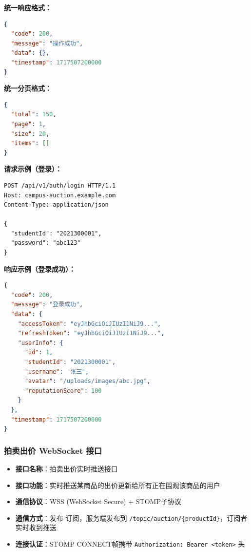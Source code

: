 \documentclass[12pt,a4paper]{ctexart}
\numberwithin{figure}{section}
\numberwithin{table}{section}
\begin{document}
\textbf{统一响应格式：}

\begin{lstlisting}[language=json]
{
  "code": 200,
  "message": "操作成功",
  "data": {},
  "timestamp": 1717507200000
}
\end{lstlisting}

\textbf{统一分页格式：}

\begin{lstlisting}[language=json]
{
  "total": 150,
  "page": 1,
  "size": 20,
  "items": []
}
\end{lstlisting}

\textbf{请求示例（登录）：}

\begin{lstlisting}
POST /api/v1/auth/login HTTP/1.1
Host: campus-auction.example.com
Content-Type: application/json

{
  "studentId": "2021300001",
  "password": "abc123"
}
\end{lstlisting}

\textbf{响应示例（登录成功）：}

\begin{lstlisting}[language=json]
{
  "code": 200,
  "message": "登录成功",
  "data": {
    "accessToken": "eyJhbGciOiJIUzI1NiJ9...",
    "refreshToken": "eyJhbGciOiJIUzI1NiJ9...",
    "userInfo": {
      "id": 1,
      "studentId": "2021300001",
      "username": "张三",
      "avatar": "/uploads/images/abc.jpg",
      "reputationScore": 100
    }
  },
  "timestamp": 1717507200000
}
\end{lstlisting}

\subsubsection{拍卖出价 WebSocket 接口}

\begin{itemize}
    \item \textbf{接口名称}：拍卖出价实时推送接口
    \item \textbf{接口功能}：实时推送某商品的出价更新给所有正在围观该商品的用户
    \item \textbf{通信协议}：WSS (WebSocket Secure) + STOMP子协议
    \item \textbf{通信方式}：发布-订阅，服务端发布到 \verb|/topic/auction/{productId}|，订阅者实时收到推送
    \item \textbf{连接认证}：STOMP CONNECT帧携带 \verb|Authorization: Bearer <token>| 头
\end{itemize}
\end{document}

